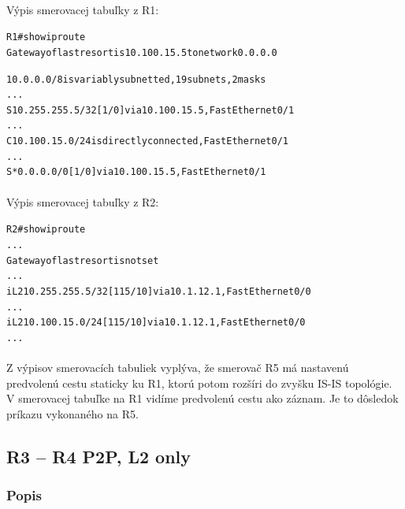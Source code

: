 \documentclass[12pt,twoside,a4paper]{report}
\begin{document}
\paragraph{}
Výpis smerovacej tabuľky z R1:

\noindent
{\selectfont
\begin{small}
\begin{alltt}
R1#show ip route
Gateway of last resort is 10.100.15.5 to network 0.0.0.0

     10.0.0.0/8 is variably subnetted, 19 subnets, 2 masks
...
S       10.255.255.5/32 [1/0] via 10.100.15.5, FastEthernet0/1
...
C       10.100.15.0/24 is directly connected, FastEthernet0/1
...
S*   0.0.0.0/0 [1/0] via 10.100.15.5, FastEthernet0/1
\end{alltt}
\end{small}
}

\paragraph{}
Výpis smerovacej tabuľky z R2:

\noindent
{\selectfont
\begin{small}
\begin{alltt}
R2#show ip route
...
Gateway of last resort is not set
...
i L2    10.255.255.5/32 [115/10] via 10.1.12.1, FastEthernet0/0
...
i L2    10.100.15.0/24 [115/10] via 10.1.12.1, FastEthernet0/0
...
\end{alltt}
\end{small}
}

\paragraph{}
Z výpisov smerovacích tabuliek vyplýva, že smerovač R5 má nastavenú predvolenú cestu staticky ku R1, ktorú potom rozšíri do zvyšku IS-IS topológie. V smerovacej tabuľke na R1 vidíme predvolenú cestu ako  záznam. Je to dôsledok príkazu  vykonaného na R5.











\subsection{R3 – R4 P2P, L2 only}
\subsubsection{Popis}
\end{document}
